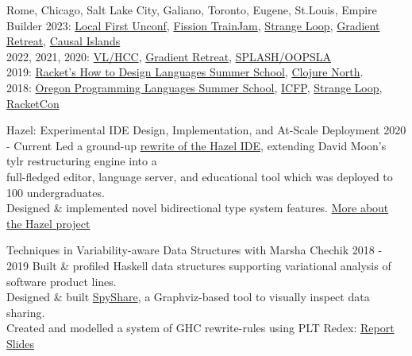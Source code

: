 \documentclass[10pt,a4paper]{article}
\begin{document}
    {Rome, Chicago, Salt Lake City, Galiano, Toronto, Eugene, St.Louis, Empire Builder}    
    {2023:
    \href{https://lu.ma/localfirstswunconf-stlouis}{Local First Unconf},
    \href{https://talk.fission.codes/t/trainjam-2023/4789}{Fission TrainJam},
    \href{https://www.thestrangeloop.com/schedule.html}{Strange Loop},
    \href{https://www.gradientretreat.com/}{Gradient Retreat}, 
    \href{https://www.causalislands.com/}{Causal Islands} \\
    2022, 2021, 2020:
    \href{https://conf.researchr.org/home/vlhcc-2022}{VL/HCC},
    \href{https://www.gradientretreat.com/}{Gradient Retreat},
    \href{https://2021.splashcon.org/track/splash-2021-oopsla}{SPLASH/OOPSLA} \\
    2019:
    \href{https://school.racket-lang.org/2019/plan/}{Racket's How to Design Languages Summer School},
    \href{https://clojurenorth.com/}{Clojure North}. \\ 
    2018:
    \href{https://www.cs.uoregon.edu/research/summerschool/summer18/}{Oregon Programming Languages Summer School},
    \href{https://conf.researchr.org/home/icfp-2018}{ICFP},
    \href{https://www.thestrangeloop.com/2018/sessions.html}{Strange Loop},
    \href{https://con.racket-lang.org/2018/}{RacketCon}}
    

  \headedsubsection
    {Hazel: Experimental IDE Design, Implementation, and At-Scale Deployment}
    {2020 - Current}
    {Led a ground-up \href{https://hazel.org/build/haz3l-tests/}{rewrite of the Hazel IDE}, extending David Moon's tylr restructuring engine into a \\ full-fledged editor, language server, and educational tool which was deployed to 100 undergraduates.\\ Designed \& implemented novel bidirectional type system features. \href{https://hazel.org/}{More about the Hazel project}}

  \headedsubsection
    {Techniques in Variability-aware Data Structures with Marsha Chechik}
    {2018 - 2019}
    {Built \& profiled Haskell data structures supporting variational analysis of software product lines. \\
    Designed \& built \href{https://github.com/disconcision/spyshare}{SpyShare}, a Graphviz-based tool to visually inspect data sharing. \\
    Created and modelled a system of GHC rewrite-rules using PLT Redex:    \href{https://github.com/disconcision/vardatalab/blob/master/CSC495_TECHNIQUES_IN_VARIABILITY_AWARE_DATA_STRUCTURES.pdf}{Report} \sbull \href{https://github.com/disconcision/vardatalab/blob/master/CSC495_variational_data_structures_slides.pdf}{Slides}}
    
\end{document}

